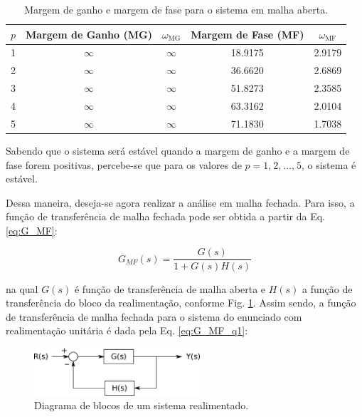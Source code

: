 \begin{table}
\centering
    \caption{Margem de ganho e margem de fase para o sistema em malha aberta.}
    \label{tab:margem_ganho_fase_ma}
    \vspace{0.25cm}
\begin{tabular}{|c|c|c|c|c|}
\hline
$p$ & Margem de Ganho (MG) & $\omega_\text{MG}$ & 
Margem de Fase (MF) & $\omega_\text{MF}$\\
\hline
\hline
1 & $\infty$ & $\infty$ & 18.9175 & 2.9179\\
\hline
2 & $\infty$ & $\infty$ & 36.6620 & 2.6869\\
\hline
3 & $\infty$ & $\infty$ & 51.8273 & 2.3585\\
\hline
4 & $\infty$ & $\infty$ & 63.3162 & 2.0104\\
\hline
5 & $\infty$ & $\infty$ & 71.1830 & 1.7038\\
\hline
\end{tabular}
\end{table}

Sabendo que o sistema será estável quando a margem de ganho e a margem de fase
forem positivas, percebe-se que para os valores de $p = 1\text{,}\ 2\text{,}\ 
\ldots\text{,}\ 5$, o sistema é estável.

Dessa maneira, deseja-se agora realizar a análise em malha fechada. Para isso, a
função de transferência de malha fechada pode ser obtida a partir da Eq.
\ref{eq:G_MF}:

\begin{equation}\label{eq:G_MF}
G_{MF}(s) = \frac{G(s)}{1+G(s)H(s)}
\end{equation}

\noindent na qual $G(s)$ é função de transferência de malha aberta e $H(s)$ a
função de transferência do bloco da realimentação, conforme Fig.
\ref{fig:diag_bloco}. Assim sendo, a função de transferência de malha fechada
para o sistema do enunciado com realimentação unitária é dada pela Eq.
\ref{eq:G_MF_q1}:

\begin{figure}[htb]
\centering
    \includegraphics[width=0.55\textwidth]{imgs/questao1/diag_bloco}
    \caption{Diagrama de blocos de um sistema realimentado.}
    \label{fig:diag_bloco}
\end{figure}

